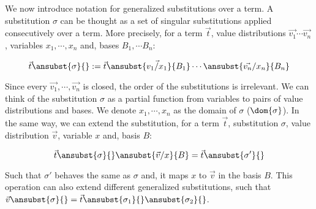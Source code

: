We now introduce notation for generalized substitutions over a term. A substitution $\sigma$ can be thought as a set of singular substitutions applied consecutively over a term. More precisely, for a term $\vec{t}$, value distributions $\vec{v_1}\dotsb\vec{v_n}$, variables $x_1,\dotsb ,x_n$ and, bases $B_1,\dotsb B_n$:

\[
  \vec{t}\ansubst{\sigma}{} := \vec{t}\ansubst{\vec{v_1/x_1}}{B_1}\dotsb\ansubst{\vec{v_n}/x_n}{B_n}
\]

Since every $\vec{v_1},\dotsb ,\vec{v_n}$ is closed, the order of the substitutions is irrelevant. We can think of the substitution $\sigma$ as a partial function from variables to pairs of value distributions and bases. We denote $x_1,\dotsb, x_n$ as the domain of $\sigma$ ($\dom{\sigma}$). In the same way, we can extend the substitution, for a term $\vec{t}$, substitution $\sigma$, value distribution $\vec{v}$, variable $x$ and, basis $B$:

\[
  \vec{t}\ansubst{\sigma}{}\ansubst{\vec{v}/x}{B} = \vec{t}\ansubst{\sigma'}{}
\]

Such that $\sigma'$ behaves the same as $\sigma$ and, it maps $x$ to $\vec{v}$ in the basis $B$. This operation can also extend different generalized substitutions, such that $\vec{v}\ansubst{\sigma}{} = \vec{t}\ansubst{\sigma_1}{}\ansubst{\sigma_2}{}$.

\iffalse
A question that might arise from the previous remark could be if taking an $\eta$-expansion on a different basis would yield different a result. In this particular instance, it is fairly simple to see that it is not the case.

\begin{lemma}[$\eta$-expansion]
  For every $\lambda$-abstraction $(\Lam{x}{\basis{X}}{\vec t})$ where $y\not\in\FV{\vec{t}}$, value distribution $\vec{v}\in\sem{\sharp{\basis{X}}}$ a .nd 
  
  \[
    (\Lam{y}{\basis{Y}}{(\Lam{x}{\basis{X}}{\vec t})\ y})\ \vec{v}\evalone (\Lam{x}{\basis{X}}{\vec{t}})\ \vec v
  \]
\end{lemma}

\begin{proof}
  Let $\vec{v}\equiv\sum_{i=1}^{n} \alpha_i \vec{b_i}$ where $\vec{b_i}\in\sem{\basis{Y}}$, we have that:
  \begin{align*}
    (\Lam{y}{\basis{Y}}{(\Lam{x}{\basis{X}}{\vec{t}})}\ y)\ \vec{v}&\evalone(\Lam{x}{\basis{X}}{\vec{t}})\ansubst{\vec{v}/y}{\basis{Y}}\\ 
    &= \sum_{i=1}^{n} \alpha_i (\Lam{x}{\basis{X}}{\vec{t}}) \vec{b_i}\\ 
    &\equiv (\Lam{x}{\basis{X}}{\vec{t}})(\sum_{i=1}^{n}\alpha_i \vec{b_i})\\
    &\equiv (\Lam{x}{\basis{X}}{\vec{t}})\vec{v}
  \end{align*}
\end{proof}
\fi